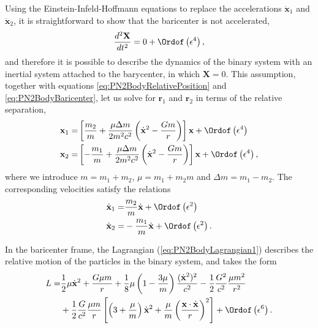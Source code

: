 Using the Einstein-Infeld-Hoffmann equations to replace the accelerations $\ddot{\textbf{x}}_1$ and $\ddot{\textbf{x}}_2$, it is straightforward to show that the baricenter is not accelerated,
\begin{equation}
\frac{d^2 \textbf{X}}{dt^2} = 0 + \Ordof \left( \epsilon^4 \right),
\end{equation}
and therefore it is possible to describe the dynamics of the binary system with an inertial system attached to the barycenter, in which  $\textbf{X} = 0$. This assumption, together with equations \ref{eq:PN2BodyRelativePosition} and \ref{eq:PN2BodyBaricenter}, let us solve for $\textbf{r}_1$ and $\textbf{r}_2$ in terms of the relative separation,
\begin{align}
\textbf{x}_1 = & \left[ \frac{m_2}{m} + \frac{\mu \Delta m}{2m^2 c^2} \left( \dot{\textbf{x}}^2 - \frac{Gm}{r} \right) \right] \textbf{x} + \Ordof \left( \epsilon^4 \right) \\
\textbf{x}_2 = & \left[ -\frac{m_1}{m}  + \frac{\mu \Delta m}{2m^2 c^2} \left( \dot{\textbf{x}}^2 - \frac{Gm}{r} \right) \right] \textbf{x} + \Ordof \left( \epsilon^4 \right),
\end{align}
where we introduce $m=m_1 + m_2$, $\mu = {m_1 + m_2}{m}$ and $\Delta m= m_1 - m_2 $. The corresponding velocities satisfy the relations
\begin{align}
\dot{\textbf{x}}_1 = & \frac{m_2}{m} \dot{\textbf{x}} + \Ordof \left( \epsilon^2 \right) \\
\dot{\textbf{x}}_2 = & - \frac{m_1}{m} \dot{\textbf{x}} + \Ordof \left( \epsilon^2 \right) .
\end{align}

In the baricenter frame, the Lagrangian (\ref{eq:PN2BodyLagrangian1}) describes the relative motion of the particles in the binary system, and takes the form
\begin{align}
L = &\frac{1}{2} \mu \dot{\textbf{x}}^2 + \frac{G \mu m}{r} + \frac{1}{8} \mu \left( 1 - \frac{3\mu}{m} \right) \frac{(\dot{\textbf{x}}^2)^2}{c^2} - \frac{1}{2} \frac{G^2}{c^2} \frac{\mu m^2}{r^2} \notag \\
& + \frac{1}{2} \frac{G}{c^2} \frac{\mu m}{r} \left[ \left( 3 + \frac{\mu }{m}\right) \dot{\textbf{x}}^2 + \frac{\mu }{m} \left( \frac{\textbf{x} \cdot \dot{\textbf{x}}}{r} \right)^2 \right]  + \Ordof \left( \epsilon^6 \right) .
\end{align}

